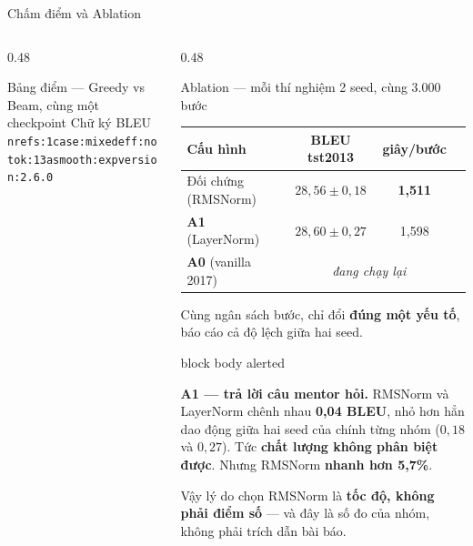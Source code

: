 \documentclass[aspectratio=169, 10pt]{beamer}
\newcommand{\bangchat}{\setlength{\tabcolsep}{3pt}}
\begin{document}
\begin{frame}[shrink=15]{Chấm điểm và Ablation}
\begin{columns}[T]
\begin{column}{0.48\textwidth}
\begin{block}{Bảng điểm — Greedy vs Beam, cùng một checkpoint}
        {\tiny Chữ ký BLEU \texttt{nrefs:1\textbar case:mixed\textbar eff:no%
        \textbar tok:13a\textbar smooth:exp\textbar version:2.6.0}}
      \end{block}
    \end{column}
    \begin{column}{0.48\textwidth}
      \begin{block}{Ablation — mỗi thí nghiệm 2 seed, cùng 3.000 bước}
        \scriptsize\bangchat
        \begin{tabular}{@{}lccc@{}}
          \toprule
          \textbf{Cấu hình} & \textbf{BLEU tst2013} & \textbf{giây/bước} \\
          \midrule
          Đối chứng (RMSNorm) & $28{,}56 \pm 0{,}18$ & \textbf{1{,}511} \\
          \textbf{A1} (LayerNorm) & $28{,}60 \pm 0{,}27$ & 1{,}598 \\
          \midrule
          \textbf{A0} (vanilla 2017) & \multicolumn{2}{c}{\textit{đang chạy lại}} \\
          \bottomrule
        \end{tabular}
        \par\vspace{0.3em}
        Cùng ngân sách bước, chỉ đổi \textbf{đúng một yếu tố}, báo cáo cả độ lệch
        giữa hai seed.
      \end{block}
      \begin{beamercolorbox}[wd=\textwidth, rounded=true, sep=6pt]{block body alerted}
        {\color{MLIOTink}\footnotesize\textbf{A1 — trả lời câu mentor hỏi.}
        RMSNorm và LayerNorm chênh nhau \textbf{0{,}04 BLEU}, nhỏ hơn hẳn dao động
        giữa hai seed của chính từng nhóm ($0{,}18$ và $0{,}27$). Tức
        \textbf{chất lượng không phân biệt được}. Nhưng RMSNorm \textbf{nhanh hơn
        5{,}7\%}.
        \par\vspace{0.2em}
        Vậy lý do chọn RMSNorm là \textbf{tốc độ, không phải điểm số} — và đây là
        số đo của nhóm, không phải trích dẫn bài báo.}
      \end{beamercolorbox}
    \end{column}
  \end{columns}
\end{frame}
\end{document}

